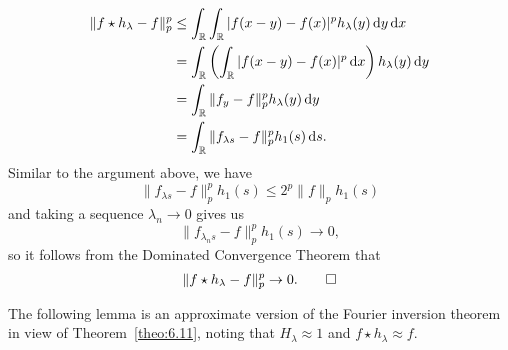 \begin{pf}
    \begin{align*}
        \|f \star h_\lambda - f\|_p^p 
        &\leq \int_{\mathbb{R}} \int_{\mathbb{R}} |f(x-y) - f(x)|^p h_\lambda(y)\,\mathrm{d} y \,\mathrm{d} x \\ 
        &= \int_{\mathbb{R}} \left( \int_{\mathbb{R}} |f(x-y) - f(x)|^p \,\mathrm{d} x \right) h_\lambda(y) \,\mathrm{d} y \\ 
        &= \int_{\mathbb{R}} \|f_y - f\|_p^p h_\lambda(y)\,\mathrm{d} y \\ 
        &= \int_{\mathbb{R}} \|f_{\lambda s} - f\|_p^p h_1(s)\,\mathrm{d} s. 
    \end{align*}
    Similar to the argument above, we have 
    \[ \|f_{\lambda s} - f\|_p^p h_1(s) \leq 2^p \|f\|_p h_1(s) \] 
    and taking a sequence $\lambda_n \to 0$ gives us
    \[ \|f_{\lambda_n s} - f\|_p^p h_1(s) \to 0, \] 
    so it follows from the Dominated Convergence Theorem that 
    \[ \|f \star h_\lambda - f\|_p^p \to 0. \qedhere \] 
\end{pf}

The following lemma is an approximate version of the Fourier inversion theorem 
in view of Theorem~\ref{theo:6.11}, noting that $H_\lambda \approx 1$ and 
$f \star h_\lambda \approx f$. 

